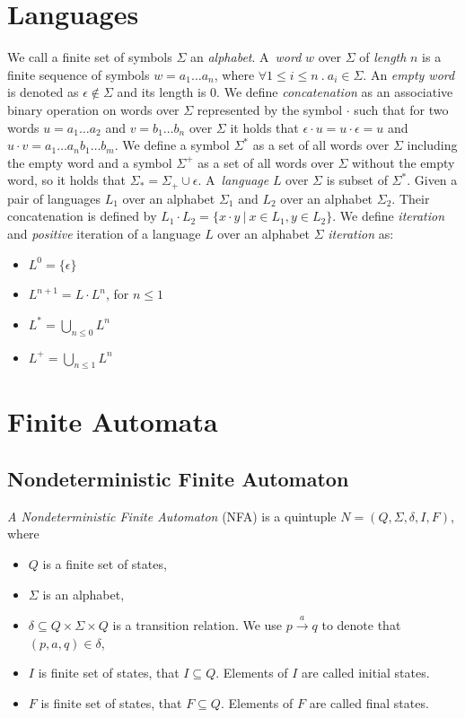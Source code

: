 \section{Languages}
We call a finite set of symbols $\Sigma$ an \emph{alphabet}. A~\emph{word} $w$ over $\Sigma$ of \emph{length} $n$ is a finite sequence of symbols 
$w=a_1\ldots a_n$, where $\forall 1 \leq i \leq n\ . \ a_i \in \Sigma$. An \emph{empty word} is denoted as $\epsilon \not\in\Sigma$ and its length is $0$. 
We define \emph{concatenation} as an associative binary operation on words over $\Sigma$ represented by the symbol $\cdot$ such that for two words $u=a_1\ldots a_2$
and $v=b_1\ldots b_n$ over $\Sigma$ it holds that $\epsilon\cdot u=u\cdot\epsilon=u$ and $u\cdot v=a_1 \ldots a_nb_1 \ldots b_m$.
We define a symbol $\Sigma^{*}$ as a set of all words over $\Sigma$ including the empty word and a symbol $\Sigma^{+}$ as a set of 
all words over $\Sigma$ without the empty word, 
so it holds that $\Sigma_{*}=\Sigma_{+}\cup\epsilon$. A~\emph{language} $L$ over $\Sigma$ is subset of $\Sigma^{*}$.
Given a pair of languages $L_1$ over an alphabet $\Sigma_{1}$ and $L_{2}$ over an alphabet $\Sigma_{2}$. Their concatenation is defined by 
$L_1\cdot L_2=\{x\cdot y\ |\ x\in L_1, y\in L_2 \}$.
We define \emph{iteration} and \emph{positive} iteration of a language $L$ over an alphabet $\Sigma$ \emph{iteration} as:
	\begin{itemize}
		\item $L^0=\{\epsilon\}$
		\item $L^{n+1}=L\cdot L^n$, for $n \leq 1$
    \item $L^{*}=\bigcup_{n\leq 0} L^{n}$
    \item $L^{+}=\bigcup_{n\leq 1} L^{n}$
	\end{itemize}

\section{Finite Automata}
\label{defFA}

	\subsection{Nondeterministic Finite Automaton}
	\label{defNFA}
		\emph{A Nondeterministic Finite Automaton} (NFA) is a quintuple $N=(Q,\Sigma,\delta,I,F)$, where
		\begin{itemize}
			\item $Q$ is a finite set of states,
			\item $\Sigma$ is an alphabet,
			\item $\delta \subseteq Q \times \Sigma \times Q$ is a transition relation. We use $p \xrightarrow{a} q$ to denote that $(p,a,q)\in\delta$,
			\item $I$ is finite set of states, that $I \subseteq Q$. Elements of $I$ are called initial states.
			\item $F$ is finite set of states, that $F \subseteq Q$. Elements of $F$ are called final states.
		\end{itemize}

